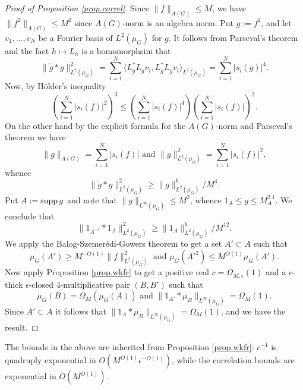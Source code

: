 \documentclass[12pt]{amsart}
\numberwithin{equation}{section}
\theoremstyle{plain}
\theoremstyle{definition}
\renewcommand{\leq}{\leqslant}
\renewcommand{\geq}{\geqslant}
\providecommand{\supp}{\mathop{\rm supp}\nolimits}
\begin{document}
\begin{proof}[Proof of Proposition \ref{prop.correl}]
Since $\|f\|_{A(G)} \leq M$, we have $\|f^2\|_{A(G)} \leq M^2$ since $A(G)$-norm is an algebra norm. Put $g:=f^2$, and let $v_1,\dots,v_N$ be a Fourier basis of $L^2(\mu_G)$ for $g$.  It follows from Parseval's theorem and the fact $h \mapsto L_h$ is a homomorphsim that
\begin{equation*}
\|\tilde{g} \ast g\|_{L^2(\mu_G)}^2 =\sum_{i=1}^N{\langle L_g^*L_gv_i,L_g^*L_gv_i\rangle_{L^2(\mu_G)}} =  \sum_{i=1}^N{|s_i(g)|^4}.
\end{equation*}
Now, by H{\"o}lder's inequality
\begin{equation*}
\left(\sum_{i=1}^N{|s_i(f)|^2}\right)^3 \leq \left(\sum_{i=1}^N{|s_i(f)|^4}\right)\left(\sum_{i=1}^N{|s_i(f)|}\right)^2.
\end{equation*}
On the other hand by the explicit formula for the $A(G)$-norm and Parseval's theorem we have
\begin{equation*}
\|g\|_{A(G)} = \sum_{i=1}^N{|s_i(f)|} \textrm{ and } \|g\|_{L^2(\mu_G)}^2=\sum_{i=1}^N{|s_i(f)|^2},
\end{equation*}
whence
\begin{equation*}
\|\tilde{g} \ast g\|_{L^2(\mu_G)}^2\geq \|g\|_{L^2(\mu_G)}^6/M^4.
\end{equation*}
Put $A:=\supp g$ and note that $\|g\|_{L^\infty(\mu_G)} \leq M^2$, whence $1_A \leq g \leq M^2.1_A$.  We conclude that
\begin{equation*}
\|1_{A^{-1}}\ast 1_A \|_{L^2(\mu_G)}^2 \geq \|1_A\|_{L^2(\mu_G)}^6/M^{12}.
\end{equation*}
We apply the Balog-Szemer{\'e}di-Gowers theorem to get a set $A' \subset A$ such that
\begin{equation*}
\mu_G(A')\geq M^{-O(1)}\|f\|_{L^2(\mu_G)}^2 \textrm{ and } \mu_G(A'^2) \leq M^{O(1)}\mu_G(A').
\end{equation*}
Now apply Proposition \ref{prop.wkfr} to get a positive real $c=\Omega_{M,\epsilon}(1)$ and a $c$-thick $\epsilon$-closed $4$-multiplicative pair $(B,B')$ such that
\begin{equation*}
\mu_G(B) = \Omega_{M}(\mu_G(A)) \textrm{ and } \|1_{A'}\ast \mu_B\|_{L^\infty(\mu_G)} =\Omega_M(1).
\end{equation*}
Since $A' \subset A$ it follows that $\|1_A \ast \mu_B\|_{L^\infty(\mu_G)}=\Omega_M(1)$, and we have the result.
\end{proof}
The bounds in the above are inherited from Proposition \ref{prop.wkfr}: $c^{-1}$ is quadruply exponential in $O(M^{O(1)}\epsilon^{-O(1)})$, while the correlation bounds are exponential in $O(M^{O(1)})$.
\end{document}
